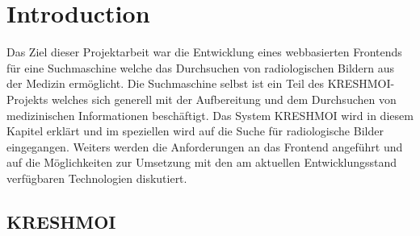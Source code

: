 
\section{Introduction}
\label{sec:introduction}
Das Ziel dieser Projektarbeit war die Entwicklung eines webbasierten Frontends für eine Suchmaschine welche das Durchsuchen von radiologischen Bildern aus der Medizin ermöglicht.
Die Suchmaschine selbst ist ein Teil des KRESHMOI-Projekts \cite{kres} welches sich generell mit der Aufbereitung und dem Durchsuchen von medizinischen Informationen beschäftigt.
Das System KRESHMOI wird in diesem Kapitel erklärt und im speziellen wird auf die Suche für radiologische Bilder eingegangen.
Weiters werden die Anforderungen an das Frontend angeführt und auf die Möglichkeiten zur Umsetzung mit den am aktuellen Entwicklungsstand verfügbaren Technologien diskutiert.

\subsection{KRESHMOI}
\label{sec:Motivation}

